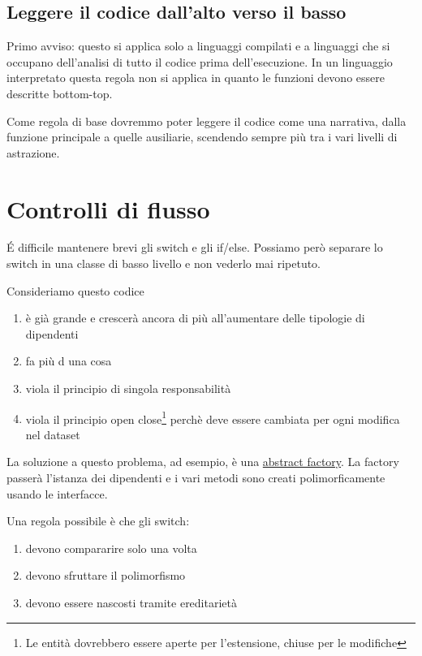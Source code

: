 \documentclass[11pt,a4paper]{book}
\begin{document}
\subsection{Leggere il codice dall'alto verso il basso}
Primo avviso: questo si applica solo a linguaggi compilati e a linguaggi che si occupano dell'analisi di tutto il codice prima dell'esecuzione. In un linguaggio interpretato questa regola non si applica in quanto le funzioni devono essere descritte bottom-top.

Come regola di base dovremmo poter leggere il codice come una narrativa, dalla funzione principale a quelle ausiliarie, scendendo sempre più tra i vari livelli di astrazione.

\section{Controlli di flusso}
É difficile mantenere brevi gli switch e gli if/else. Possiamo però separare lo switch in una classe di basso livello e non vederlo mai ripetuto.

Consideriamo questo codice
\label{code: 015}
\begin{enumerate}
	\item è già grande e crescerà ancora di più all'aumentare delle tipologie di dipendenti
	\item fa più d una cosa
	\item viola il principio di singola responsabilità
	\item viola il principio open close\footnote{Le entità dovrebbero essere aperte per l'estensione, chiuse per le modifiche} perchè deve essere cambiata per ogni modifica nel dataset
\end{enumerate}

La soluzione a questo problema, ad esempio, è una \href{https://refactoring.guru/design-patterns/abstract-factory}{abstract factory}. La factory passerà l'istanza dei dipendenti e i vari metodi sono creati polimorficamente usando le interfacce.

Una regola possibile è che gli switch:
\begin{enumerate}
	\item devono compararire solo una volta
	\item devono sfruttare il polimorfismo
	\item devono essere nascosti tramite ereditarietà
\end{enumerate}
\label{code: 016}
\end{document}
